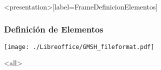 
\begin{frame}<presentation>[label=FrameDefinicionElementos]
  \frametitle{Definición de Elementos}
  \texttt{[image: ./Libreoffice/GMSH\_fileformat.pdf]}
\end{frame}

\mode<all>
